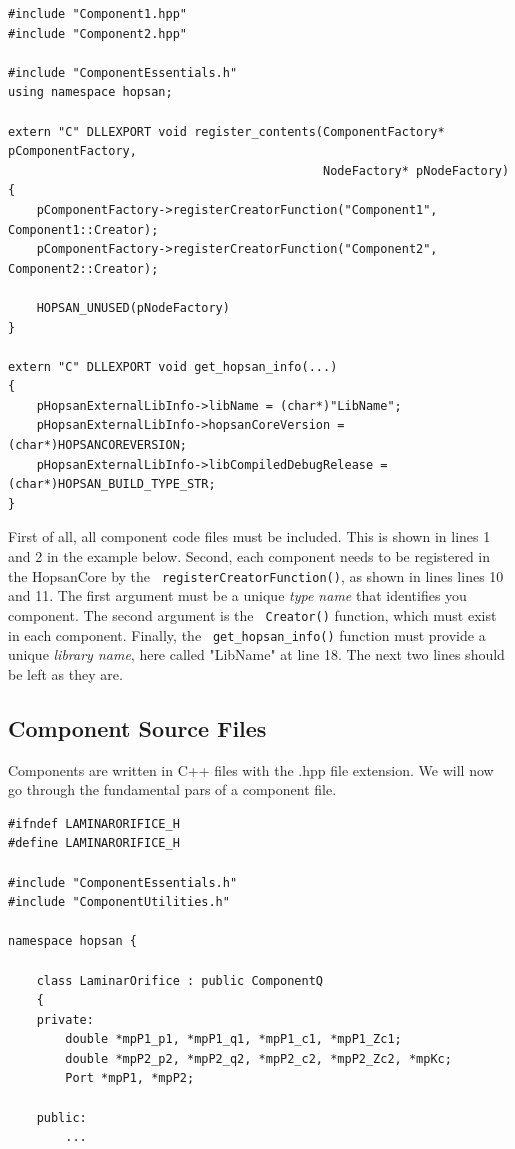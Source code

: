 \documentclass[a4paper,pdftex]{article}
\newcommand\code[1]{\setlength\emergencystretch{3cm} \texttt{\color{blue} #1}}
\begin{document}
\begin{minipage}{\linewidth}
\begin{lstlisting}[basicstyle=\footnotesize\ttfamily]
#include "Component1.hpp"
#include "Component2.hpp"

#include "ComponentEssentials.h"
using namespace hopsan;

extern "C" DLLEXPORT void register_contents(ComponentFactory* pComponentFactory, 
                                            NodeFactory* pNodeFactory)
{    
    pComponentFactory->registerCreatorFunction("Component1", Component1::Creator);
    pComponentFactory->registerCreatorFunction("Component2", Component2::Creator);

    HOPSAN_UNUSED(pNodeFactory)
}

extern "C" DLLEXPORT void get_hopsan_info(...)
{
    pHopsanExternalLibInfo->libName = (char*)"LibName";
    pHopsanExternalLibInfo->hopsanCoreVersion = (char*)HOPSANCOREVERSION;
    pHopsanExternalLibInfo->libCompiledDebugRelease = (char*)HOPSAN_BUILD_TYPE_STR;
}
\end{lstlisting}
\end{minipage}
\newpage
\noindent First of all, all component code files must be included. This is shown in lines 1 and 2 in the example below.
Second, each component needs to be registered in the HopsanCore by the \code{registerCreatorFunction()}, as shown in lines  lines 10 and 11.
The first argument must be a unique \textit{type name} that identifies you component. 
The second argument is the \code{Creator()} function, which must exist in each component.
Finally, the \code{get\_hopsan\_info()} function must provide a unique \textit{library name}, here called "LibName" at line 18. 
The next two lines should be left as they are.

\subsection*{Component Source Files}
Components are written in C++ files with the .hpp file extension. 
We will now go through the fundamental pars of a component file.\\

\begin{minipage}{\linewidth}
\begin{lstlisting}[basicstyle=\footnotesize\ttfamily]
#ifndef LAMINARORIFICE_H
#define LAMINARORIFICE_H

#include "ComponentEssentials.h"
#include "ComponentUtilities.h"

namespace hopsan {

    class LaminarOrifice : public ComponentQ
    {
    private:
        double *mpP1_p1, *mpP1_q1, *mpP1_c1, *mpP1_Zc1;
        double *mpP2_p2, *mpP2_q2, *mpP2_c2, *mpP2_Zc2, *mpKc;
        Port *mpP1, *mpP2;
       
    public:
        ...
\end{lstlisting}
\end{minipage}
\end{document}
